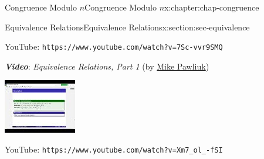\documentclass[oneside,10pt,]{book}
\newcommand{\mono}[1]{\texttt{#1}}
\newcommand{\alert}[1]{\textbf{\textit{#1}}}
\numberwithin{equation}{section}
\newlength{\qrsize}
\newlength{\previewwidth}
\begin{document}
\begin{chapterptx}{Congruence Modulo \(n\)}{}{Congruence Modulo \(n\)}{}{}{x:chapter:chap-congruence}
\begin{sectionptx}{Equivalence Relations}{}{Equivalence Relations}{}{}{x:section:sec-equivalence}
\begin{sidebyside}{1}{0}{0}{0}
\begin{sbspanel}{1}
\begin{tcbraster}[raster columns=2, raster column skip=1pt, raster halign=center, raster force size=false, raster left skip=0pt, raster right skip=0pt]
\begin{tcolorbox}[qrstyle]%
{\hypersetup{urlcolor=black}}%
\end{tcolorbox}%
\begin{tcolorbox}[captionstyle]%
\small YouTube: \mono{https://www.youtube.com/watch?v=7Sc-vvr9SMQ}\end{tcolorbox}%
\end{tcbraster}%
\end{sbspanel}%
\end{sidebyside}%
\par
\alert{Video}: \emph{Equivalence Relations, Part 1} (by \href{https://www.youtube.com/channel/UCnzqLoGhxAA46i9xcPHZavQ}{Mike Pawliuk})%
\begin{sidebyside}{1}{0}{0}{0}%
\begin{sbspanel}{1}%
\setlength{\qrsize}{9em}
\setlength{\previewwidth}{\linewidth}
\addtolength{\previewwidth}{-\qrsize}
\begin{tcbraster}[raster columns=2, raster column skip=1pt, raster halign=center, raster force size=false, raster left skip=0pt, raster right skip=0pt]%
\begin{tcolorbox}[previewstyle, width=\previewwidth]%
\includegraphics[width=0.80\linewidth,height=\qrsize,keepaspectratio]{images/video-equivalence-relation-2.jpg}%
\end{tcolorbox}%
\begin{tcolorbox}[qrstyle]%
{\hypersetup{urlcolor=black}}%
\end{tcolorbox}%
\begin{tcolorbox}[captionstyle]%
\small YouTube: \mono{https://www.youtube.com/watch?v=Xm7\_ol\_-fSI}\end{tcolorbox}%

\end{tcbraster}
\end{sbspanel}
\end{sidebyside}
\end{sectionptx}
\end{chapterptx}
\end{document}
